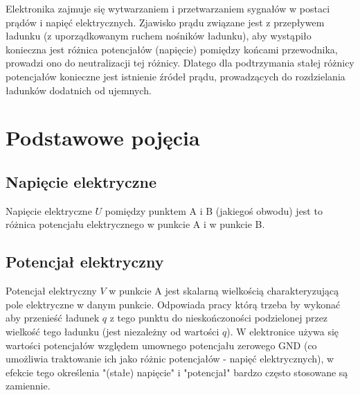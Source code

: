 % 
% 
% 
% 

Elektronika zajmuje się wytwarzaniem i przetwarzaniem sygnałów w postaci prądów i napięć elektrycznych.
Zjawisko prądu związane jest z przepływem ładunku (z uporządkowanym ruchem nośników ładunku), aby wystąpiło konieczna jest różnica potencjałów (napięcie) pomiędzy końcami przewodnika, prowadzi ono do neutralizacji tej różnicy.
Dlatego dla podtrzymania stałej różnicy potencjałów konieczne jest istnienie źródeł prądu, prowadzących do rozdzielania ładunków dodatnich od ujemnych.

\section{Podstawowe pojęcia}

\subsection{Napięcie elektryczne}
    Napięcie elektryczne $U$ pomiędzy punktem A i B (jakiegoś obwodu)
    jest to różnica potencjału elektrycznego w punkcie A i w punkcie B.
\subsection{Potencjał elektryczny}
    Potencjał elektryczny $V$ w punkcie A
    jest skalarną wielkością charakteryzującą pole elektryczne w danym punkcie. Odpowiada pracy którą trzeba by wykonać aby przenieść ładunek $q$ z tego punktu do nieskończoności podzielonej przez wielkość tego ładunku (jest niezależny od wartości $q$).
    W elektronice używa się wartości potencjałów względem umownego potencjału zerowego GND (co umożliwia traktowanie ich jako różnic potencjałów - napięć elektrycznych), w efekcie tego określenia "(stałe) napięcie" i "potencjał" bardzo często stosowane są zamiennie. 
